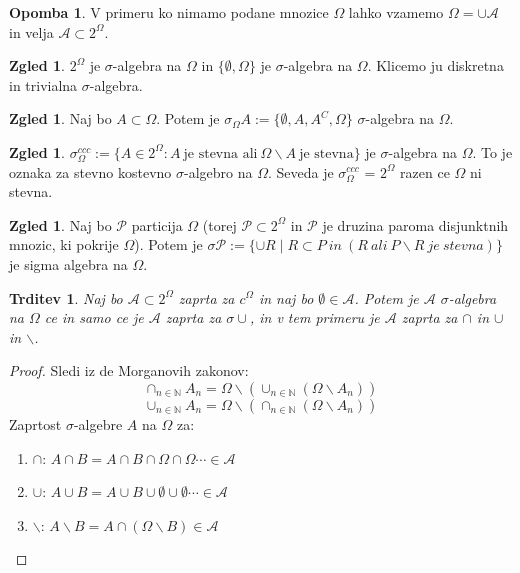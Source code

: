 \documentclass[a4paper,12pt]{article}
\theoremstyle{definition} %
\newtheorem{zgled}[definicija]{Zgled}
\newtheorem{opomba}[definicija]{Opomba}
\theoremstyle{plain} %
\newtheorem{trditev}[definicija]{Trditev}
\newcommand{\N}{\mathbb{N}}
\newcommand{\A}{\mathcal{A}}
\begin{document}
        \begin{opomba}
            V primeru ko nimamo podane mnozice $\Omega$ lahko vzamemo $\Omega = \cup\A$ in velja $\A \subset 2^{\Omega}.$
        \end{opomba}

        \begin{zgled}
            $2^\Omega$ je $\sigma$-algebra na $\Omega$ in $\{\emptyset, \Omega\}$ je $\sigma$-algebra na $\Omega$. Klicemo ju diskretna in trivialna $\sigma$-algebra.
        \end{zgled}

        \begin{zgled}
        Naj bo $A \subset \Omega$. Potem je $ \sigma_\Omega A:=\{\emptyset, A, A^C, \Omega\}$ $\sigma$-algebra na $\Omega$.
        \end{zgled}

        \begin{zgled}
        $\sigma_\Omega^{ccc} := \{ A \in 2^\Omega: A \ \text{je stevna ali} \ \Omega \backslash A \ \text{je stevna}\}$ je $\sigma$-algebra na $\Omega$.
        To je oznaka za stevno kostevno $\sigma$-algebro na $\Omega$. Seveda je $\sigma_\Omega^{ccc}$ = $2^\Omega$ razen ce $\Omega$ ni stevna.
        \end{zgled}

        \begin{zgled}
        Naj bo $\mathcal{P}$ particija $\Omega$ (torej $\mathcal{P} \subset 2^\Omega$ in $\mathcal{P}$ je druzina paroma disjunktnih mnozic, ki pokrije $\Omega$).
        Potem je $\sigma \mathcal{P} := \{\cup R \mid R \subset P \ in \ (R \ ali \ P\backslash R \ je \ stevna)\}$ je sigma algebra na $\Omega$.
        \end{zgled}

        \begin{trditev}
            Naj bo $\A \subset 2^\Omega$ zaprta za $c^\Omega$ in naj bo $\emptyset \in \A$. Potem je $\A$ $\sigma$-algebra na $\Omega$ ce in samo ce je $\A$ zaprta za $\sigma\cup$, in v tem primeru je $\A$ zaprta za $\cap$ in $\cup$ in $\backslash$.
        \end{trditev}
        \begin{proof}
            Sledi iz de Morganovih zakonov:
            $$
            \cap_{n \in \N} A_n = \Omega \backslash \left(\cup_{n \in \N}(\Omega\backslash A_n) \right)
            $$
            $$
            \cup_{n \in \N} A_n = \Omega \backslash \left(\cap_{n \in \N}(\Omega\backslash A_n) \right)
            $$
            Zaprtost $\sigma$-algebre $A$ na $\Omega$ za:
            \begin{enumerate}
                \item $\cap$: $A \cap B = A \cap B \cap \Omega \cap \Omega \cdots \in \A$
                \item $\cup$: $A \cup B = A \cup B \cup \emptyset \cup \emptyset \cdots \in \A$
                \item $\backslash$: $A \backslash B = A  \cap \left( \Omega \backslash B \right) \in \A$
            \end{enumerate}

        \end{proof}
\end{document}
